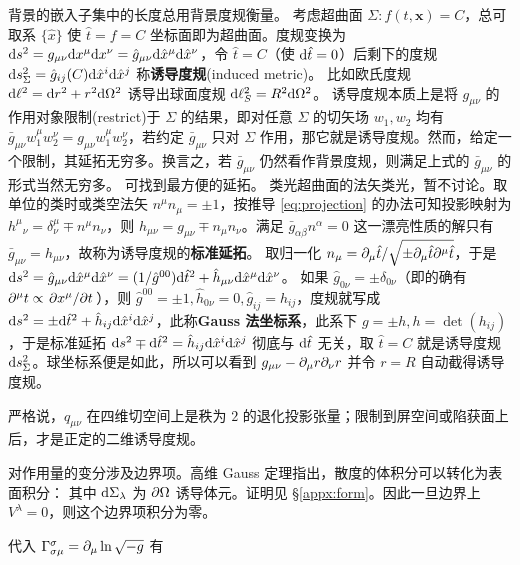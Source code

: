 背景的嵌入子集中的长度总用背景度规衡量。
考虑超曲面 $\Sigma:f(t,\bm x)=C$，总可取系 $\{\hat x\}$ 使 $\hat t=f=C$ 坐标面即为超曲面。度规变换为 $\dd s^2=g_{\mu\nu}\dd x^\mu\dd x^\nu=\hat g_{\mu\nu}\dd\hat x^\mu\dd\hat x^\nu$，令 $\hat t=C$（使 $\dd\hat t=0$）后剩下的度规 $\dd s^2_\Sigma= \hat g_{ij}(C)\dd\hat x^i\dd\hat x^j$ 称\textbf{诱导度规}(induced metric)。
比如欧氏度规 $\dd\ell^2=\dd r^2+r^2\dd\Omega^2$ 诱导出球面度规 $\dd\ell^2_S=R^2\dd\Omega^2$。
诱导度规本质上是将 $g_{\mu\nu}$ 的作用对象限制(restrict)于 $\Sigma$ 的结果，即对任意 $\Sigma$ 的切矢场 $w_1,w_2$ 均有 $\bar g_{\mu\nu}w_1^\mu w_2^\nu=g_{\mu\nu}w_1^\mu w_2^\nu$，若约定 $\bar g_{\mu\nu}$ 只对 $\Sigma$ 作用，那它就是诱导度规。然而，给定一个限制，其延拓无穷多。换言之，若 $\bar g_{\mu\nu}$ 仍然看作背景度规，则满足上式的 $\bar g_{\mu\nu}$ 的形式当然无穷多。
可找到最方便的延拓。
类光超曲面的法矢类光，暂不讨论。取单位的类时或类空法矢 $n^\mu n_\mu = \pm 1$，按推导 \eqref{eq:projection} 的办法可知投影映射为 $h^\mu{}_\nu =\delta^\mu_\nu \mp n^\mu n_\nu$，则 $h_{\mu\nu} = g_{\mu\nu} \mp n_\mu n_\nu$。满足 $\bar g_{\alpha\beta}n^\alpha = 0$ 这一漂亮性质的解只有 $\bar g_{\mu\nu} = h_{\mu\nu}$，故称为诱导度规的\textbf{标准延拓}。
取归一化 $n_\mu = \partial_\mu\hat t/\sqrt{\pm \partial_\mu\hat t \partial^\mu\hat t}$，于是 $\dd s^2= \hat g_{\mu\nu}\dd\hat x^\mu\dd\hat x^\nu = (1/\hat g^{00})\dd\hat t^2+\hat h_{\mu\nu}\dd\hat x^\mu\dd\hat x^\nu$。
如果 $\hat g_{0\nu} = \pm\delta_{0\nu}$（即的确有 $\partial^\mu t\propto \pdv*{x^\mu}{t}$），则 $\hat g^{00}=\pm 1,\hat h_{0\nu} = 0,\hat g_{ij}=\hat h_{ij}$，度规就写成 $\dd s^2=\pm\dd\hat t^2+\hat h_{ij}\dd\hat x^i\dd\hat x^j$，此称\textbf{Gauss 法坐标系}，此系下 $g=\pm h,h=\det(h_{ij})$，于是标准延拓 $\dd s^2\mp\dd\hat t^2=\hat h_{ij}\dd\hat x^i\dd\hat x^j$ 彻底与 $\dd\hat t$ 无关，取 $\hat t=C$ 就是诱导度规 $\dd s^2_\Sigma$。球坐标系便是如此，所以可以看到 $g_{\mu\nu} - \partial_\mu r \partial_\nu r$ 并令 $r=R$ 自动截得诱导度规。

严格说，$q_{\mu\nu}$ 在四维切空间上是秩为 $2$ 的退化投影张量；限制到屏空间或陷获面上后，才是正定的二维诱导度规。

对作用量的变分涉及边界项。高维 Gauss 定理指出，散度的体积分可以转化为表面积分：
其中 $\dd{\Sigma}_\lambda$ 为 $\partial\Omega$ 诱导体元。证明见 \S\ref{appx:form}。因此一旦边界上 $V^\lambda = 0$，则这个边界项积分为零。

代入 $\Gamma_{ \sigma\mu}^\sigma=\partial_\mu\ln\sqrt{-g}$ 有

